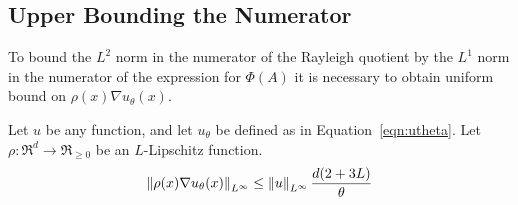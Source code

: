 \subsection{Upper Bounding the Numerator}
To bound the $L^2$ norm in
  the numerator of the Rayleigh quotient by the $L^1$ norm in the
  numerator of the expression for $\Phi(A)$ it is necessary to obtain
  uniform bound on $\rho(x) \nabla u_\theta(x)$. 
  
  \begin{lemma} \label{lem:rep1}
  Let $u$ be any function, and let $u_{\theta}$ be defined as in
  Equation~\ref{eqn:utheta}. Let $\rho: \Re^d \to \Re_{\geq 0}$ be an
  $L$-Lipschitz function.
  \begin{align}
  \left\lVert \rho (x) \nabla u_\theta(x) \right\rVert_{{L^\infty}}
    \leq \left\lVert u \right\rVert_{{L^\infty}} \frac{d(2+3L)}{\theta}
  \end{align}
  \end{lemma}

